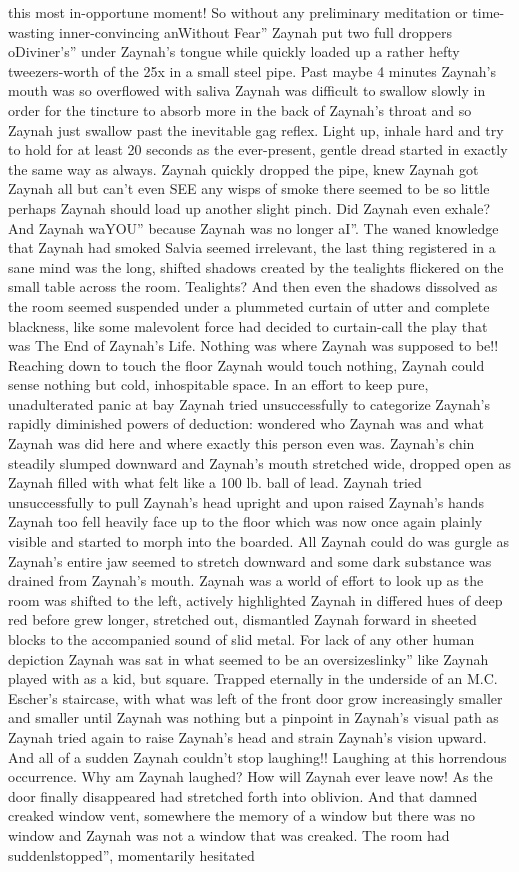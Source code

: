 \documentclass[12pt]{book}
\begin{document}
this most in-opportune moment! So without any preliminary meditation or time-wasting inner-convincing anWithout Fear'' Zaynah put two full droppers oDiviner's'' under Zaynah's tongue while quickly loaded up a rather hefty tweezers-worth of the 25x in a small steel pipe. Past maybe 4 minutes Zaynah's mouth was so overflowed with saliva Zaynah was difficult to swallow slowly in order for the tincture to absorb more in the back of Zaynah's throat and so Zaynah just swallow past the inevitable gag reflex. Light up, inhale hard and try to hold for at least 20 seconds as the ever-present, gentle dread started in exactly the same way as always. Zaynah quickly dropped the pipe, knew Zaynah got Zaynah all but can't even SEE any wisps of smoke there seemed to be so little perhaps Zaynah should load up another slight pinch. Did Zaynah even exhale? And Zaynah waYOU'' because Zaynah was no longer aI''. The waned knowledge that Zaynah had smoked Salvia seemed irrelevant, the last thing registered in a sane mind was the long, shifted shadows created by the tealights flickered on the small table across the room. Tealights? And then even the shadows dissolved as the room seemed suspended under a plummeted curtain of utter and complete blackness, like some malevolent force had decided to curtain-call the play that was The End of Zaynah's Life. Nothing was where Zaynah was supposed to be!! Reaching down to touch the floor Zaynah would touch nothing, Zaynah could sense nothing but cold, inhospitable space. In an effort to keep pure, unadulterated panic at bay Zaynah tried unsuccessfully to categorize Zaynah's rapidly diminished powers of deduction: wondered who Zaynah was and what Zaynah was did here and where exactly this person even was. Zaynah's chin steadily slumped downward and Zaynah's mouth stretched wide, dropped open as Zaynah filled with what felt like a 100 lb. ball of lead. Zaynah tried unsuccessfully to pull Zaynah's head upright and upon raised Zaynah's hands Zaynah too fell heavily face up to the floor which was now once again plainly visible and started to morph into the boarded. All Zaynah could do was gurgle as Zaynah's entire jaw seemed to stretch downward and some dark substance was drained from Zaynah's mouth. Zaynah was a world of effort to look up as the room was shifted to the left, actively highlighted Zaynah in differed hues of deep red before grew longer, stretched out, dismantled Zaynah forward in sheeted blocks to the accompanied sound of slid metal. For lack of any other human depiction Zaynah was sat in what seemed to be an oversizeslinky'' like Zaynah played with as a kid, but square. Trapped eternally in the underside of an M.C. Escher's staircase, with what was left of the front door grow increasingly smaller and smaller until Zaynah was nothing but a pinpoint in Zaynah's visual path as Zaynah tried again to raise Zaynah's head and strain Zaynah's vision upward. And all of a sudden Zaynah couldn't stop laughing!! Laughing at this horrendous occurrence. Why am Zaynah laughed? How will Zaynah ever leave now! As the door finally disappeared had stretched forth into oblivion. And that damned creaked window vent, somewhere the memory of a window but there was no window and Zaynah was not a window that was creaked. The room had suddenlstopped'', momentarily hesitated 
\end{document}
